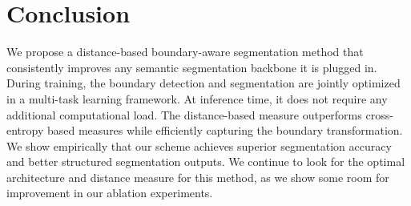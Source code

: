 \documentclass[final]{cvpr}
\begin{document}
\section{Conclusion} \label{sec:conclusion}
We propose a distance-based boundary-aware segmentation method that consistently improves any semantic segmentation backbone it is plugged in. During training, the boundary detection and segmentation are jointly optimized in a multi-task learning framework. At inference time, it does not require any additional computational load. The distance-based measure outperforms cross-entropy based measures while efficiently capturing the boundary transformation. We show empirically that our scheme achieves superior segmentation accuracy and better structured segmentation outputs. We continue to look for the optimal architecture and distance measure for this method, as we show some room for improvement in our ablation experiments.

{\small


}
\end{document}

